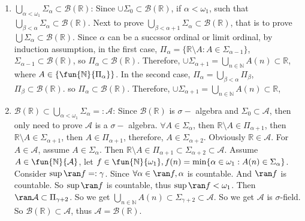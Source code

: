 \documentclass{ctexart}
\begin{document}
\begin{solution}
  \begin{enumerate}
    \item \(\bigcup_{\alpha < \omega_1} \Sigma_{\alpha} \subset \mathcal{B}(\mathbb{R})\):
      Since \(\cup\Sigma_0 \subset \mathcal{B}(\mathbb{R})\), if \(\alpha < \omega_1\), such that \(\bigcup_{\beta <\alpha}\Sigma_{\alpha} \subset \mathcal{B}(\mathbb{R})\).
      Next to prove \(\bigcup_{\beta < \alpha + 1} \Sigma_{\alpha} \subset \mathcal{B}(\mathbb{R})\), 
      that is to prove \(\bigcup \Sigma_{\alpha} \subset \mathcal{B}(\mathbb{R})\).
      Since \(\alpha\) can be a succssor ordinal or limit ordinal, 
      by induction assumption, 
      in the first case, \(\Pi_{\alpha} = \{\mathbb{R} \setminus A : A \in \Sigma_{\alpha - 1 }\}\), 
      \(\Sigma_{\alpha -1} \subset \mathcal{B}(\mathbb{R}) \), so \(\Pi_{\alpha} \subset \mathcal{B}(\mathbb{R})\).
      Therefore, \(\cup \Sigma_{\alpha+1} = \bigcup_{n \in \mathbb{N}} A(n) \subset \mathbb{R}\), 
      where \(A \in \{\fun{\mathbb{N}}{\Pi_{\alpha}}\}\). 
      In the second case, \(\Pi_{\alpha } = \bigcup_{\beta < \alpha} \Pi_{\beta}\), \(\Pi_{\beta} \subset \mathcal{B}(\mathbb{R})\).
      so \(\Pi_{\alpha} \subset \mathcal{B}(\mathbb{R})\). 
      Therefore, \(\cup \Sigma_{\alpha+1} = \bigcup_{n \in \mathbb{N}} A(n) \subset \mathbb{R}\), 
    \item \(\mathcal{B}(\mathbb{R}) \subset \bigcup_{\alpha < \omega_1} \Sigma_{\alpha} =: \mathcal{A}\):
      Since \(\mathcal{B}(\mathbb{R})\) is \(\sigma-\) algebra and \(\Sigma_0 \subset \mathcal{A}\), then only 
      need to prove \(\mathcal{A}\) is a \(\sigma-\) algebra.
      \(\forall A \in\Sigma_{\alpha}\), then \(\mathbb{R} \setminus A \in \Pi_{\alpha+1}\),
      then \(\mathbb{R} \setminus A \in \Sigma_{\alpha + 1}\), then \(A \in \Pi_{\alpha+1}\), 
      therefore, \(A \in \Sigma_{\alpha+2}\). 
      Obviously \(\mathbb{R} \in \mathcal{A}\). For \(A \in \mathcal{A}\), assume \(A \in \Sigma_{\alpha}\). 
      Then \(\mathbb{R}\setminus A \in \Pi_{\alpha+1} \subset \Sigma_{\alpha + 2 }\subset \mathcal{A}\). 
      Assume \(A \in \fun{\mathbb{N}}{\mathcal{A}}\), let \(f \in \fun{\mathbb{N}}{\omega_1},f(n)=\min\{\alpha \in \omega_1:A(n) \in \Sigma_{\alpha}\}\). 
      Consider \(\sup \ran f =:\gamma\). Since \(\forall \alpha \in \ran f,\alpha\) is countable. And \(\ran f\) is countable. 
      So \(\sup \ran f\) is countable, thus \(\sup \ran f <\omega_1\). 
      Then \(\ran \mathcal{A} \subset \Pi_{\gamma+2} \). So we get \(\bigcup_{n \in \mathbb{N}} A(n) \subset \Sigma_{\gamma+2} \subset \mathcal{A}\). 
      So we get \(\mathcal{A} \) is \(\sigma\)-field. So \(\mathcal{B}(\mathbb{R}) \subset \mathcal{A}\), thus \(\mathcal{A}=\mathcal{B}(\mathbb{R})\). 

  \end{enumerate}
\end{solution}
\end{document}
